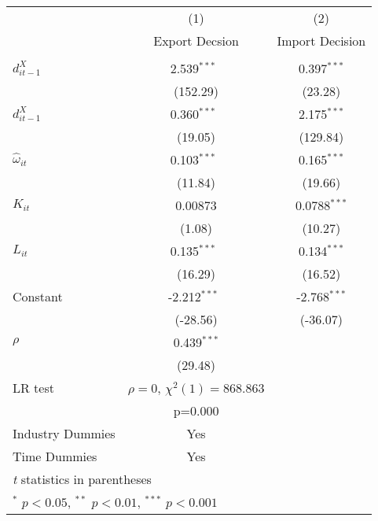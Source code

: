 \begin{center}
\begin{tabular}{l*{2}{c}}
\hline\hline
            &\multicolumn{1}{c}{(1)}&\multicolumn{1}{c}{(2)}\\
            &\multicolumn{1}{c}{Export
              Decsion}&\multicolumn{1}{c}{Import Decision}\\
\hline\\

$d_{it-1}^{X}$      &       2.539$^{***}$\ &       0.397$^{***}$\\
            &    (152.29)          &     (23.28)         \\
[1em]                                                    
$d_{it-1}^{X}$      &       0.360$^{***}$\ &       2.175$^{***}$\\
            &     (19.05)          &    (129.84)         \\
[1em]                                                    
$\hat{\omega}_{it}$       &       0.103$^{***}$\ &       0.165$^{***}$\\
            &     (11.84)          &     (19.66)         \\
[1em]                                                    
$K_{it}$       &     0.00873          &      0.0788$^{***}$\\\
            &      (1.08)          &     (10.27)         \\
[1em]                                                    
$L_{it}$     &       0.135$^{***}$\ &       0.134$^{***}$\\
            &     (16.29)          &     (16.52)         \\
[1em]                                                    
Constant      &      -2.212$^{***}$\ &      -2.768$^{***}$\\
            &    (-28.56)          &    (-36.07)         \\
\hline                                                   
$\rho$                                &       0.439$^{***}$ &\\
                                 &     (29.48)         &\\
LR test& $\rho=0$, $\chi^{2}(1)= 868.863$&\\
& p=0.000&\\
Industry Dummies & Yes& \\
Time Dummies& Yes& \\
\hline\hline
\multicolumn{2}{l}{\footnotesize \textit{t} statistics in parentheses}\\
\multicolumn{2}{l}{\footnotesize $^{*}$ \(p<0.05\), $^{**}$ \(p<0.01\), $^{***}$ \(p<0.001\)}\\
\end{tabular}
\end{center}

